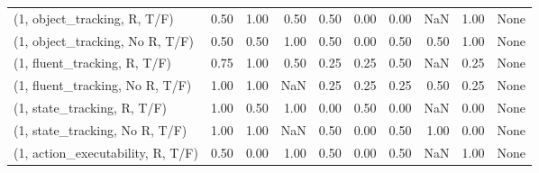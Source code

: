 \begin{table*}[h!]
\begin{adjustbox}{width=2\columnwidth,center}
\begin{tabular}{lrrr|rrr|rrr}
\midrule
(1, object\_tracking, R, T/F)         &                      0.50 &                  1.00 &                      0.50 &                          0.50 &                      0.00 &                          0.00 &                                    NaN &                               1.00 &                                  None \\
(1, object\_tracking, No R, T/F)      &                      0.50 &                  0.50 &                      1.00 &                          0.50 &                      0.00 &                          0.50 &                                   0.50 &                               1.00 &                                  None \\
(1, fluent\_tracking, R, T/F)         &                      0.75 &                  1.00 &                      0.50 &                          0.25 &                      0.25 &                          0.50 &                                    NaN &                               0.25 &                                  None \\
(1, fluent\_tracking, No R, T/F)      &                      1.00 &                  1.00 &                       NaN &                          0.25 &                      0.25 &                          0.25 &                                   0.50 &                               0.25 &                                  None \\
(1, state\_tracking, R, T/F)          &                      1.00 &                  0.50 &                      1.00 &                          0.00 &                      0.50 &                          0.00 &                                    NaN &                               0.00 &                                  None \\
(1, state\_tracking, No R, T/F)       &                      1.00 &                  1.00 &                       NaN &                          0.50 &                      0.00 &                          0.50 &                                   1.00 &                               0.00 &                                  None \\
(1, action\_executability, R, T/F)    &                      0.50 &                  0.00 &                      1.00 &                          0.50 &                      0.00 &                          0.50 &                                    NaN &                               1.00 &                                  None \\

\end{tabular}
\end{adjustbox}
\end{table*}
